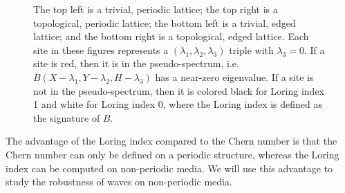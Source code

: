 \documentclass[a4paper]{article}
\begin{document}
\begin{figure}
\centering
{}%
%

%
%
\caption{The top left is a trivial, periodic lattice; the top right is a topological, periodic lattice; the bottom left is a trivial, edged lattice; and the bottom right is a topological, edged lattice. Each site in these figures represents a $(\lambda_1,\lambda_2,\lambda_3)$ triple with $\lambda_3 = 0$. If a site is red, then it is in the pseudo-spectrum, i.e. $B(X - \lambda_1, Y - \lambda_2, H - \lambda_3)$ has a near-zero eigenvalue. If a site is not in the pseudo-spectrum, then it is colored black for Loring index 1 and white for Loring index 0, where the Loring index is defined as the signature of $B$.\\
}%
\label{fig:Loring Haldane}%
\end{figure}
The advantage of the Loring index compared to the Chern number is that the Chern number can only be defined on a periodic structure, whereas the Loring index can be computed on non-periodic media. We will use this advantage to study the robustness of waves on non-periodic media.
\end{document}
